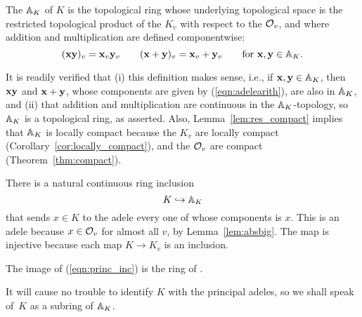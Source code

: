 \begin{definition}\label{def:adele}
  The  $\AA_K$ of $K$ is the topological ring whose
  underlying topological space is the restricted topological product
  of the $K_v$ with respect to the $\O_v$, and where addition and
  multiplication are defined componentwise:
\begin{equation}\label{eqn:adelearith} 
(\bx \by)_v = \bx_v \by_v \qquad
(\bx + \by)_v = \bx_v + \by_v\qquad
\text{for }\bx, \by\in\AA_K.
\end{equation}
\end{definition}
It is readily verified that (i) this definition makes sense, i.e., if
$\bx, \by\in \AA_K$, then $\bx\by$ and $\bx+\by$, whose components are
given by (\ref{eqn:adelearith}), are also in $\AA_K$, and (ii) that
addition and multiplication are continuous in the $\AA_K$-topology, so
$\AA_K$ is a topological ring, as asserted.  
Also,
Lemma~\ref{lem:res_compact} implies that $\AA_K$ is locally compact
because the $K_v$ are locally compact
(Corollary~\ref{cor:locally_compact}), and the $\O_v$ are 
compact (Theorem~\ref{thm:compact}).

There is a natural continuous ring inclusion
\begin{equation}\label{eqn:princ_inc} 
K\hra \AA_K
\end{equation}
that sends $x\in K$ to the adele every one of whose components is $x$.
This is an adele because $x\in \O_v$ for almost all $v$, by
Lemma~\ref{lem:absbig}.  The map is injective because each map $K\to
K_v$ is an inclusion.
 
\begin{definition}
  The image of (\ref{eqn:princ_inc}) is the ring of .
\end{definition}
It will cause no trouble to identify $K$ with the principal adeles, so
we shall speak of~$K$ as a subring of $\AA_K$.

